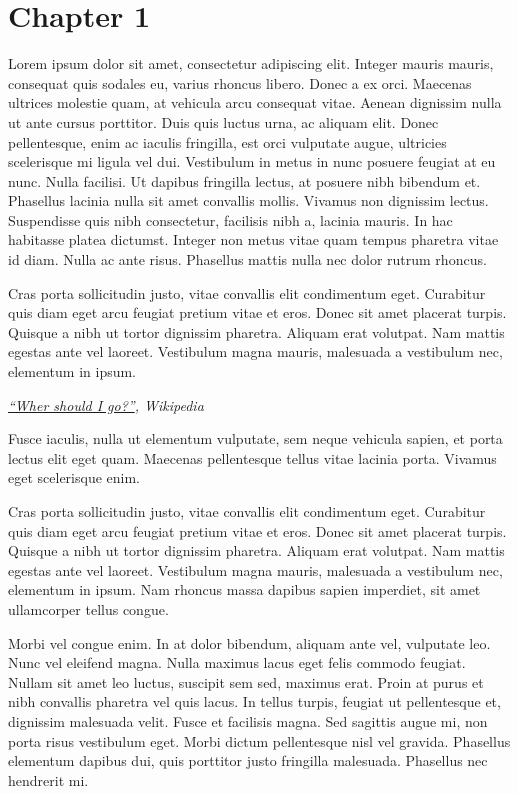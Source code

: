 \chapter{Chapter 1}

Lorem ipsum dolor sit amet, consectetur adipiscing elit. Integer mauris mauris, consequat quis sodales eu, varius rhoncus libero. Donec a ex orci. Maecenas ultrices molestie quam, at vehicula arcu consequat vitae. Aenean dignissim nulla ut ante cursus porttitor. Duis quis luctus urna, ac aliquam elit. Donec pellentesque, enim ac iaculis fringilla, est orci vulputate augue, ultricies scelerisque mi ligula vel dui. Vestibulum in metus in nunc posuere feugiat at eu nunc. Nulla facilisi. Ut dapibus fringilla lectus, at posuere nibh bibendum et. Phasellus lacinia nulla sit amet convallis mollis. Vivamus non dignissim lectus. Suspendisse quis nibh consectetur, facilisis nibh a, lacinia mauris. In hac habitasse platea dictumst. Integer non metus vitae quam tempus pharetra vitae id diam. Nulla ac ante risus. Phasellus mattis nulla nec dolor rutrum rhoncus.

\epigraph{Cras porta sollicitudin justo, vitae convallis elit condimentum eget. Curabitur quis diam eget arcu feugiat pretium vitae et eros. Donec sit amet placerat turpis. Quisque a nibh ut tortor dignissim pharetra. Aliquam erat volutpat. Nam mattis egestas ante vel laoreet. Vestibulum magna mauris, malesuada a vestibulum nec, elementum in ipsum.}{\textit{\href{https://wikipedia.org/}{``Wher should I go?''}, Wikipedia}}

Fusce iaculis, nulla ut elementum vulputate, sem neque vehicula sapien, et porta lectus elit eget quam. Maecenas pellentesque tellus vitae lacinia porta. Vivamus eget scelerisque enim. 

Cras porta sollicitudin justo, vitae convallis elit condimentum eget. Curabitur quis diam eget arcu feugiat pretium vitae et eros. Donec sit amet placerat turpis. Quisque a nibh ut tortor dignissim pharetra. Aliquam erat volutpat. Nam mattis egestas ante vel laoreet. Vestibulum magna mauris, malesuada a vestibulum nec, elementum in ipsum. Nam rhoncus massa dapibus sapien imperdiet, sit amet ullamcorper tellus congue.

Morbi vel congue enim. In at dolor bibendum, aliquam ante vel, vulputate leo. Nunc vel eleifend magna. Nulla maximus lacus eget felis commodo feugiat. Nullam sit amet leo luctus, suscipit sem sed, maximus erat. Proin at purus et nibh convallis pharetra vel quis lacus. In tellus turpis, feugiat ut pellentesque et, dignissim malesuada velit. Fusce et facilisis magna. Sed sagittis augue mi, non porta risus vestibulum eget. Morbi dictum pellentesque nisl vel gravida. Phasellus elementum dapibus dui, quis porttitor justo fringilla malesuada. Phasellus nec hendrerit mi.


